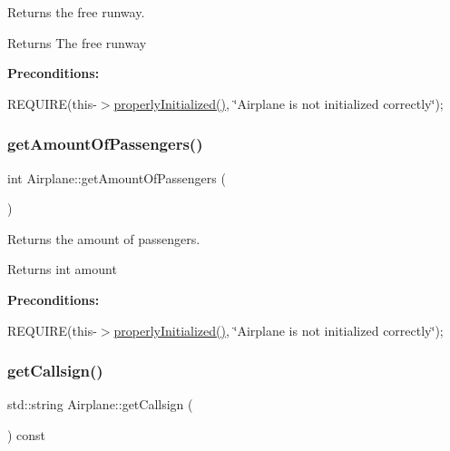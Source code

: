 Returns the free runway. 

\begin{DoxyReturn}{Returns}
The free runway
\end{DoxyReturn}
{\bfseries Preconditions\+:}
\begin{DoxyItemize}
\item R\+E\+Q\+U\+I\+RE(this-\/$>$\mbox{\hyperlink{class_airplane_a6f80df8f692cc8d67d292c1e9f26d59e}{properly\+Initialized()}}, \char`\"{}\+Airplane is not initialized correctly\char`\"{}); 
\end{DoxyItemize}\mbox{\label{class_airplane_acb38911857c36d345cf3c02462894b2b}} 
\subsubsection{\texorpdfstring{get\+Amount\+Of\+Passengers()}{getAmountOfPassengers()}}
{\footnotesize\ttfamily int Airplane\+::get\+Amount\+Of\+Passengers (\begin{DoxyParamCaption}{ }\end{DoxyParamCaption})}



Returns the amount of passengers. 

\begin{DoxyReturn}{Returns}
int amount
\end{DoxyReturn}
{\bfseries Preconditions\+:}
\begin{DoxyItemize}
\item R\+E\+Q\+U\+I\+RE(this-\/$>$\mbox{\hyperlink{class_airplane_a6f80df8f692cc8d67d292c1e9f26d59e}{properly\+Initialized()}}, \char`\"{}\+Airplane is not initialized correctly\char`\"{}); 
\end{DoxyItemize}\mbox{\label{class_airplane_af7e30dcc3191147869b0208edf7000c5}} 
\subsubsection{\texorpdfstring{get\+Callsign()}{getCallsign()}}
{\footnotesize\ttfamily std\+::string Airplane\+::get\+Callsign (\begin{DoxyParamCaption}{ }\end{DoxyParamCaption}) const}



